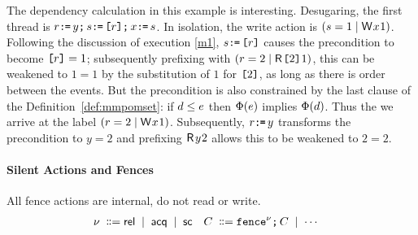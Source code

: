 The dependency calculation in this example is interesting.  Desugaring, the
first thread is $r\texttt{:}\mkern-1mu\texttt{=}\, y\texttt{;}\,\allowbreak s\texttt{:}\mkern-1mu\texttt{=}\, \texttt{[}r\texttt{]}\texttt{;}\,\allowbreak x\texttt{:}\mkern-1mu\texttt{=}\, s$.
In isolation, the write action is $(\bReg=1\mid\DW{x}{1})$.  Following the
discussion of execution \eqref{m1}, $s\texttt{:}\mkern-1mu\texttt{=}\, \texttt{[}r\texttt{]}$ causes the
precondition to become $\texttt{[}r\texttt{]}=1$; subsequently prefixing with
$(\aReg=2\mid\DR{\REF{2}}{1})$, this can be weakened to $1=1$ by the
substitution of $1$ for $\texttt{[}2\texttt{]}$, as long as there is order between the events.  But the precondition is also constrained
by the last clause of the Definition~\ref{def:mmpomset}:
 if $d\le e$ then $\Phi(e)$ implies $\Phi(d)$.
%
Thus the we arrive at the label $(\aReg=2\mid\DW{x}{1})$.  Subsequently,
$r\texttt{:}\mkern-1mu\texttt{=}\, y$ transforms the precondition to $y=2$ and prefixing $\DR{y}{2}$
allows this to be weakened to $2=2$.


\paragraph{Silent Actions and Fences}

All fence actions are internal, do not read or write.
\begin{align*}
  \fmode \BNFDEF& \modeREL \BNFSEP \modeACQ \BNFSEP \modeSC
  &
  \aCmd %
  \BNFDEF& \FENCE^{\fmode} \SEMI \aCmd
  \BNFSEP \cdots 
\end{align*}

